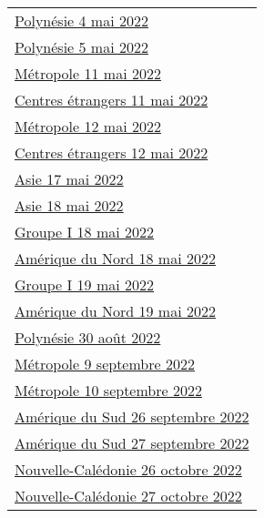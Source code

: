 \documentclass[10pt,a4paper]{article}
\begin{document}
\begin{tabularx}{\linewidth}{>{\Large}X} 
\Large 

\hyperlink{Polynesie1}{Polynésie 4 mai 2022} \dotfill \pageref{Polynesie1}\\
\hyperlink{Polynesie2}{Polynésie 5 mai 2022} \dotfill \pageref{Polynesie2}\\
\hyperlink{Metropole1}{Métropole 11 mai 2022} \dotfill \pageref{Metropole1}\\
\hyperlink{Centresetrangers1}{Centres étrangers 11 mai 2022} \dotfill \pageref{Centresetrangers1}\\
\hyperlink{Metropole2}{Métropole  12 mai 2022} \dotfill \pageref{Metropole2}\\
\hyperlink{Centresetrangers2}{Centres étrangers 12 mai 2022} \dotfill \pageref{Centresetrangers2}\\
\hyperlink{Asie1}{Asie 17 mai 2022} \dotfill \pageref{Asie1}\\
\hyperlink{Asie2}{Asie 18 mai 2022} \dotfill \pageref{Asie2}\\
\hyperlink{GroupeI1}{Groupe I 18 mai 2022} \dotfill \pageref{GroupeI1}\\
\hyperlink{AmeriqueNord1}{Amérique du Nord 18 mai 2022} \dotfill \pageref{AmeriqueNord1}\\
\hyperlink{GroupeI2}{Groupe I 19 mai 2022} \dotfill \pageref{GroupeI2}\\
\hyperlink{AmeriqueNord2}{Amérique du Nord 19 mai 2022} \dotfill \pageref{AmeriqueNord2}\\
\hyperlink{Polynesie3}{Polynésie 30 août 2022} \dotfill \pageref{Polynesie3}\\
\hyperlink{Metropole3}{Métropole 9 septembre 2022} \dotfill \pageref{Metropole3}\\
\hyperlink{Metropole3}{Métropole 10 septembre 2022} \dotfill \pageref{Metropole4}\\
\hyperlink{AmeriSud1}{Amérique du Sud  26 septembre 2022}\dotfill \pageref{AmeriSud1}\\
\hyperlink{AmeriSud2}{Amérique du Sud  27 septembre 2022}\dotfill \pageref{AmeriSud2}\\
\hyperlink{NCaledo1}{Nouvelle-Calédonie 26 octobre 2022} \dotfill \pageref{NCaledo1}\\
\hyperlink{NCaledo2}{Nouvelle-Calédonie 27 octobre 2022} \dotfill \pageref{NCaledo2}\\
\end{tabularx}
\vspace{1cm}
\end{document}
